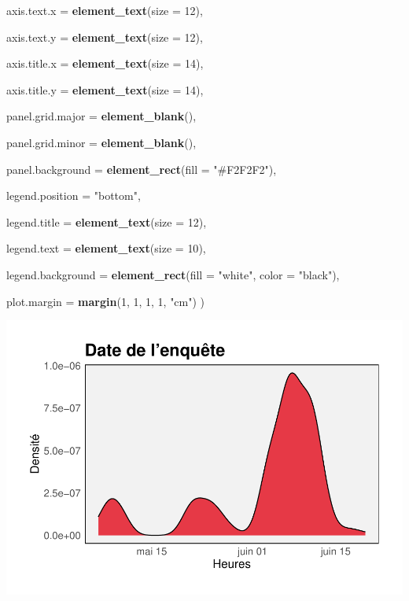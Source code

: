 \documentclass[
]{article}
\newenvironment{Shaded}{\begin{snugshade}}{\end{snugshade}}
\newcommand{\AttributeTok}[1]{\textcolor[rgb]{0.13,0.29,0.53}{#1}}
\newcommand{\DecValTok}[1]{\textcolor[rgb]{0.00,0.00,0.81}{#1}}
\newcommand{\FunctionTok}[1]{\textcolor[rgb]{0.13,0.29,0.53}{\textbf{#1}}}
\newcommand{\NormalTok}[1]{#1}
\newcommand{\StringTok}[1]{\textcolor[rgb]{0.31,0.60,0.02}{#1}}
\begin{document}
\begin{Shaded}
\begin{Highlighting}[]
    \AttributeTok{axis.text.x =} \FunctionTok{element\_text}\NormalTok{(}\AttributeTok{size =} \DecValTok{12}\NormalTok{),}
    
    \AttributeTok{axis.text.y =} \FunctionTok{element\_text}\NormalTok{(}\AttributeTok{size =} \DecValTok{12}\NormalTok{),}
    
    \AttributeTok{axis.title.x =} \FunctionTok{element\_text}\NormalTok{(}\AttributeTok{size =} \DecValTok{14}\NormalTok{),}
    
    \AttributeTok{axis.title.y =} \FunctionTok{element\_text}\NormalTok{(}\AttributeTok{size =} \DecValTok{14}\NormalTok{),}
    
    \AttributeTok{panel.grid.major =} \FunctionTok{element\_blank}\NormalTok{(),}
    
    \AttributeTok{panel.grid.minor =} \FunctionTok{element\_blank}\NormalTok{(),}
    
    \AttributeTok{panel.background =} \FunctionTok{element\_rect}\NormalTok{(}\AttributeTok{fill =} \StringTok{"\#F2F2F2"}\NormalTok{),}
    
    \AttributeTok{legend.position =} \StringTok{"bottom"}\NormalTok{,}
    
    \AttributeTok{legend.title =} \FunctionTok{element\_text}\NormalTok{(}\AttributeTok{size =} \DecValTok{12}\NormalTok{),}
    
    \AttributeTok{legend.text =} \FunctionTok{element\_text}\NormalTok{(}\AttributeTok{size =} \DecValTok{10}\NormalTok{),}
    
    \AttributeTok{legend.background =} \FunctionTok{element\_rect}\NormalTok{(}\AttributeTok{fill =} \StringTok{"white"}\NormalTok{, }\AttributeTok{color =} \StringTok{"black"}\NormalTok{),}
    
    \AttributeTok{plot.margin =} \FunctionTok{margin}\NormalTok{(}\DecValTok{1}\NormalTok{, }\DecValTok{1}\NormalTok{, }\DecValTok{1}\NormalTok{, }\DecValTok{1}\NormalTok{, }\StringTok{"cm"}\NormalTok{)}
\NormalTok{  )}
\end{Highlighting}
\end{Shaded}

\includegraphics{PROJET_files/figure-latex/unnamed-chunk-15-1.pdf}
\end{document}
